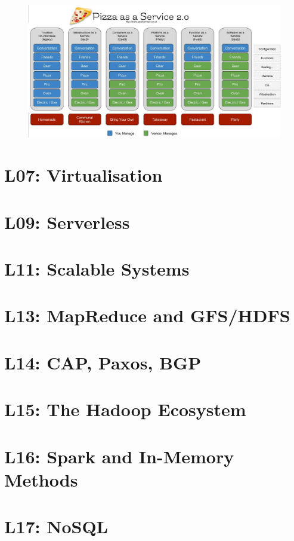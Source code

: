 \documentclass[a4paper]{article}
\begin{document}
\begin{multicols}{3}
\begin{figure}[H]
    \includegraphics[width=\linewidth]{pizzaserviceexample.png}
    \label{fig:pizzaservice}
\end{figure}

\section*{L07: Virtualisation}

\section*{L09: Serverless}

\section*{L11: Scalable Systems}

\section*{L13: MapReduce and GFS/HDFS}

\section*{L14: CAP, Paxos, BGP}

\section*{L15: The Hadoop Ecosystem}

\section*{L16: Spark and In-Memory Methods}

\section*{L17: NoSQL}


\end{multicols}
\end{document}
